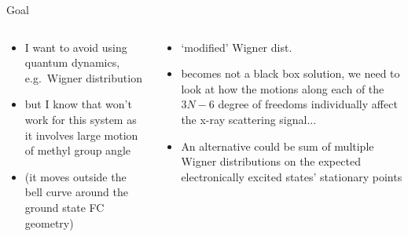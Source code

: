 \documentclass{beamer}
\begin{document}
\begin{frame}{Goal}
	\begin{columns} 
		\begin{column}{.5\textwidth}
			\begin{itemize}

				\item I want to avoid using quantum dynamics, e.g.\ Wigner distribution
				\item but I know that won't work for this system as it involves large motion of methyl group angle
				\item (it moves outside the bell curve around the ground state FC geometry)
				
			\end{itemize}
		\end{column}
		\begin{column}{.5\textwidth}
			\begin{itemize}
				\item `modified' Wigner dist.
				\item becomes not a black box solution, we need to look at how the motions along each of the $3N-6$ degree of freedoms individually affect the x-ray scattering signal...
				\item An alternative could be sum of multiple Wigner distributions on the expected electronically excited states' stationary points
			\end{itemize}
		\end{column}%
		
	\end{columns}
\end{frame}
\end{document}
